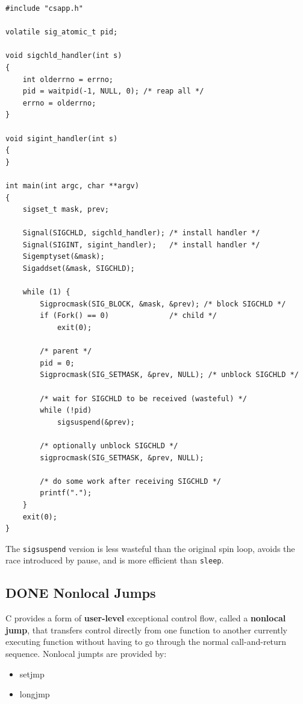 \documentclass[11pt]{article}
\begin{document}
\begin{verbatim}
#include "csapp.h"

volatile sig_atomic_t pid;

void sigchld_handler(int s)
{
    int olderrno = errno;
    pid = waitpid(-1, NULL, 0);	/* reap all */
    errno = olderrno;
}

void sigint_handler(int s)
{
}

int main(int argc, char **argv)
{
    sigset_t mask, prev;

    Signal(SIGCHLD, sigchld_handler); /* install handler */
    Signal(SIGINT, sigint_handler);   /* install handler */
    Sigemptyset(&mask);
    Sigaddset(&mask, SIGCHLD);

    while (1) {
        Sigprocmask(SIG_BLOCK, &mask, &prev); /* block SIGCHLD */
        if (Fork() == 0)		      /* child */
            exit(0);

        /* parent */
        pid = 0;
        Sigprocmask(SIG_SETMASK, &prev, NULL); /* unblock SIGCHLD */

        /* wait for SIGCHLD to be received (wasteful) */
        while (!pid)
            sigsuspend(&prev);

        /* optionally unblock SIGCHLD */
        sigprocmask(SIG_SETMASK, &prev, NULL);

        /* do some work after receiving SIGCHLD */
        printf(".");
    }
    exit(0);
}

\end{verbatim}

The \texttt{sigsuspend} version is less wasteful than the original spin loop, avoids the race introduced by pause, and is more efficient than \texttt{sleep}.\\

\subsection{{\bfseries\sffamily DONE} Nonlocal Jumps}
\label{sec:org3221bdb}
C provides a form of \textbf{user-level} exceptional control flow, called a \textbf{nonlocal jump}, that transfers control directly from one function to another currently executing function without having to go through the normal call-and-return sequence. Nonlocal jumpts are provided by:\\
\begin{itemize}
\item setjmp\\
\item longjmp\\
\end{itemize}
\end{document}
